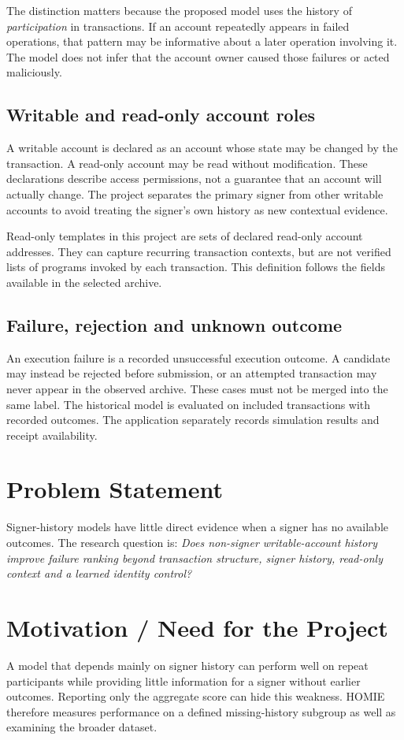 \documentclass[12pt,a4paper,oneside]{report}
\begin{document}
The distinction matters because the proposed model uses the history of \emph{participation} in transactions. If an account repeatedly appears in failed operations, that pattern may be informative about a later operation involving it. The model does not infer that the account owner caused those failures or acted maliciously.
\subsection{Writable and read-only account roles}
A writable account is declared as an account whose state may be changed by the transaction. A read-only account may be read without modification. These declarations describe access permissions, not a guarantee that an account will actually change. The project separates the primary signer from other writable accounts to avoid treating the signer's own history as new contextual evidence.

Read-only templates in this project are sets of declared read-only account addresses. They can capture recurring transaction contexts, but are not verified lists of programs invoked by each transaction. This definition follows the fields available in the selected archive.
\subsection{Failure, rejection and unknown outcome}
An execution failure is a recorded unsuccessful execution outcome. A candidate may instead be rejected before submission, or an attempted transaction may never appear in the observed archive. These cases must not be merged into the same label. The historical model is evaluated on included transactions with recorded outcomes. The application separately records simulation results and receipt availability.

\section{Problem Statement}
Signer-history models have little direct evidence when a signer has no available outcomes. The research question is: \emph{Does non-signer writable-account history improve failure ranking beyond transaction structure, signer history, read-only context and a learned identity control?}

\section{Motivation / Need for the Project}
A model that depends mainly on signer history can perform well on repeat participants while providing little information for a signer without earlier outcomes. Reporting only the aggregate score can hide this weakness. HOMIE therefore measures performance on a defined missing-history subgroup as well as examining the broader dataset.
\end{document}
